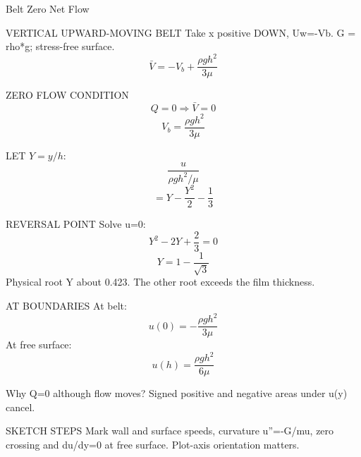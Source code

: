 Belt Zero Net Flow

VERTICAL UPWARD-MOVING BELT
Take x positive DOWN, Uw=-Vb.
G = rho*g; stress-free surface.
$$\bar V=-V_b+\frac{\rho gh^2}{3\mu}$$

ZERO FLOW CONDITION
$$Q=0\Rightarrow\bar V=0$$
$$V_b=\frac{\rho gh^2}{3\mu}$$

LET $Y=y/h$:
$$\frac{u}{\rho gh^2/\mu}$$
$$=Y-\frac{Y^2}{2}-\frac{1}{3}$$

REVERSAL POINT
Solve u=0:
$$Y^2-2Y+\frac{2}{3}=0$$
$$Y=1-\frac{1}{\sqrt3}$$
Physical root Y about 0.423.
The other root exceeds the film thickness.

AT BOUNDARIES
At belt:
$$u(0)=-\frac{\rho gh^2}{3\mu}$$
At free surface:
$$u(h)=\frac{\rho gh^2}{6\mu}$$

Why Q=0 although flow moves? Signed positive and negative areas under u(y) cancel.

SKETCH STEPS
Mark wall and surface speeds, curvature u''=-G/mu, zero crossing and du/dy=0 at free surface. Plot-axis orientation matters.
